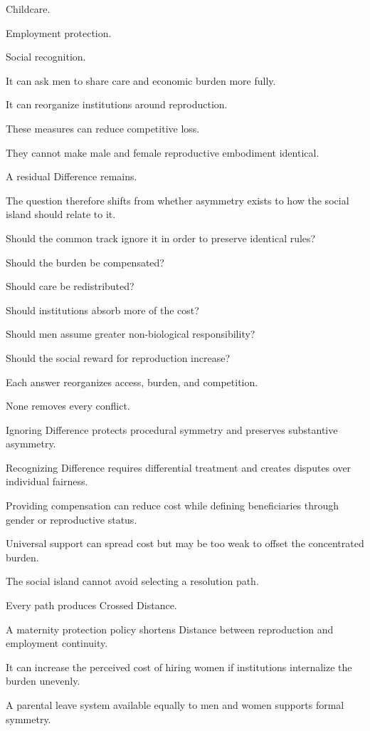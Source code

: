 Childcare.

Employment protection.

Social recognition.

It can ask men to share care and economic burden more fully.

It can reorganize institutions around reproduction.

These measures can reduce competitive loss.

They cannot make male and female reproductive embodiment identical.

A residual Difference remains.

The question therefore shifts from whether asymmetry exists to how the social island should relate to it.

Should the common track ignore it in order to preserve identical rules?

Should the burden be compensated?

Should care be redistributed?

Should institutions absorb more of the cost?

Should men assume greater non-biological responsibility?

Should the social reward for reproduction increase?

Each answer reorganizes access, burden, and competition.

None removes every conflict.

Ignoring Difference protects procedural symmetry and preserves substantive asymmetry.

Recognizing Difference requires differential treatment and creates disputes over individual fairness.

Providing compensation can reduce cost while defining beneficiaries through gender or reproductive status.

Universal support can spread cost but may be too weak to offset the concentrated burden.

The social island cannot avoid selecting a resolution path.

Every path produces Crossed Distance.

A maternity protection policy shortens Distance between reproduction and employment continuity.

It can increase the perceived cost of hiring women if institutions internalize the burden unevenly.

A parental leave system available equally to men and women supports formal symmetry.

